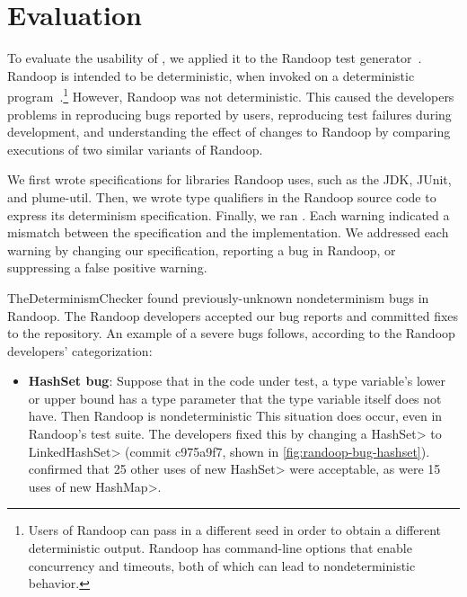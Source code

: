 \section{Evaluation\label{sec:results}}
To evaluate the usability of \theDeterminismChecker,
we applied it to the Randoop test
generator~\cite{PachecoLEB2007}.
Randoop is intended to be deterministic, when invoked on a deterministic
program~\cite{randoop-manual}.\footnote{Users of Randoop can pass in a different seed in order to
    obtain a different deterministic output.  Randoop has command-line
    options that enable concurrency and timeouts, both of which can lead to
    nondeterministic behavior.}
However, Randoop was not deterministic.  This caused the developers
problems in 
reproducing bugs reported by users, 
reproducing test failures during development, and
understanding the effect of changes to Randoop by comparing executions of two
similar variants of Randoop.

We first wrote specifications for libraries Randoop uses, such as the JDK,
JUnit, and plume-util.
Then, we wrote type qualifiers in the Randoop source code to express its
determinism specification.
Finally, we ran
\theDeterminismChecker.  Each warning indicated a mismatch between the
specification and the implementation.  We addressed each warning by changing our
specification, reporting a bug in Randoop, or suppressing a false positive warning.

TheDeterminismChecker found \numRandoopBugs previously-unknown nondeterminism bugs in Randoop.
The Randoop developers accepted our bug reports and committed fixes to the repository. An example
of a severe bugs follows, according to the Randoop developers' categorization:

\begin{itemize}
    \item
    \textbf{HashSet bug}: Suppose that in the code under test, a type variable's lower or upper
    bound has a type parameter that the type variable itself does not have. Then Randoop is nondeterministic
    This situation does occur, even in Randoop's test suite.
    The developers fixed this by changing a \<HashSet> to \<LinkedHashSet>
    (commit c975a9f7, shown in \cref{fig:randoop-bug-hashset}).
    \TheDeterminismChecker confirmed that 
    25 other uses of \<new HashSet> were acceptable, as were 15 uses of \<new HashMap>.
\end{itemize}

